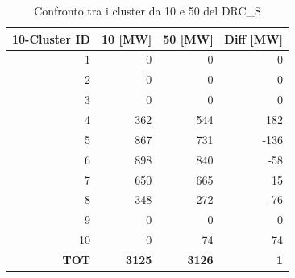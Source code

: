 \begin{table}[H]
\centering
\caption{Confronto tra i cluster da 10 e 50 del DRC\_S}
\label{tab:drcs_10v50}
\begin{tabular}{r r r r}
\toprule
\textbf{10-Cluster ID} & \textbf{10 [MW]} & \textbf{50 [MW]} & \textbf{Diff [MW]} \\
\midrule
1 & 0 & 0 & 0 \\
2 & 0 & 0 & 0 \\
3 & 0 & 0 & 0 \\
4 & 362 & 544 & 182 \\
5 & 867 & 731 & -136 \\
6 & 898 & 840 & -58 \\
7 & 650 & 665 & 15 \\
8 & 348 & 272 & -76 \\
9 & 0 & 0 & 0 \\
10 & 0 & 74 & 74 \\
\midrule
\textbf{TOT} & \textbf{3125} & \textbf{3126} & \textbf{1} \\
\bottomrule
\end{tabular}
\end{table}